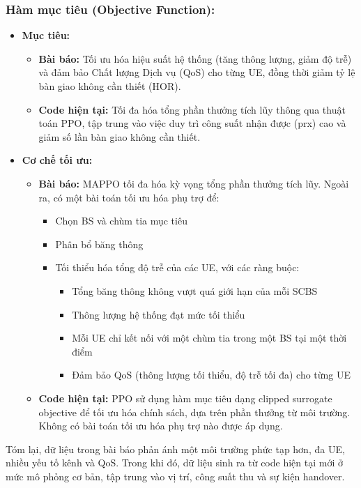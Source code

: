 \documentclass{article} %
\begin{document}
    \subsubsection{Hàm mục tiêu (Objective Function):}
    \begin{itemize}
    
    \item \textbf{Mục tiêu:} 
    \begin{itemize}
        \item \textbf{Bài báo:} Tối ưu hóa hiệu suất hệ thống (tăng thông lượng, giảm độ trễ) và đảm bảo Chất lượng Dịch vụ (QoS) cho từng UE, đồng thời giảm tỷ lệ bàn giao không cần thiết (HOR).
        \item \textbf{Code hiện tại:} Tối đa hóa tổng phần thưởng tích lũy thông qua thuật toán PPO, tập trung vào việc duy trì công suất nhận được (prx) cao và giảm số lần bàn giao không cần thiết.
    \end{itemize}
    \item \textbf{Cơ chế tối ưu:} 
    \begin{itemize}
        \item \textbf{Bài báo:} MAPPO tối đa hóa kỳ vọng tổng phần thưởng tích lũy. Ngoài ra, có một bài toán tối ưu hóa phụ trợ để:
\begin{itemize}
    \item Chọn BS và chùm tia mục tiêu
    \item Phân bổ băng thông
    \item Tối thiểu hóa tổng độ trễ của các UE, với các ràng buộc:
    \begin{itemize}
        \item Tổng băng thông không vượt quá giới hạn của mỗi SCBS
        \item Thông lượng hệ thống đạt mức tối thiểu
        \item Mỗi UE chỉ kết nối với một chùm tia trong một BS tại một thời điểm
        \item Đảm bảo QoS (thông lượng tối thiểu, độ trễ tối đa) cho từng UE
    \end{itemize}
\end{itemize}
        \item \textbf{Code hiện tại:} PPO sử dụng hàm mục tiêu dạng clipped surrogate objective để tối ưu hóa chính sách, dựa trên phần thưởng từ môi trường. Không có bài toán tối ưu hóa phụ trợ nào được áp dụng.
    \end{itemize}
\end{itemize}
Tóm lại, dữ liệu trong bài báo phản ánh một môi trường phức tạp hơn, đa UE, nhiều yếu tố kênh và QoS. Trong khi đó, dữ liệu sinh ra từ code hiện tại mới ở mức mô phỏng cơ bản, tập trung vào vị trí, công suất thu và sự kiện handover.

\newpage
{}


\newpage
\end{document}

